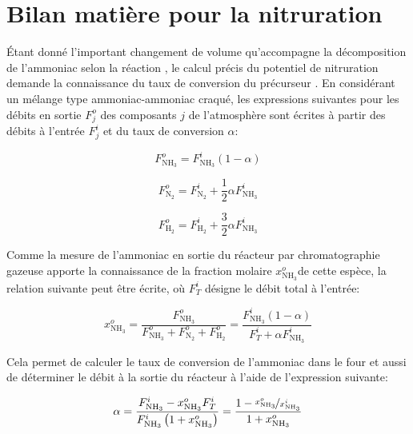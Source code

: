 \chapter{Bilan matière pour la nitruration}
\label{an:ammonia_decomposition}

Étant donné l'important changement de volume qu'accompagne la décomposition de l'ammoniac selon la réaction , le calcul précis du potentiel de nitruration demande la connaissance du taux de conversion du précurseur . En considérant un mélange type ammoniac-ammoniac craqué, les expressions suivantes pour les débits en sortie $F_{j}^{o}$ des composants $j$ de l'atmosphère sont écrites à partir des débits à l'entrée $F_{j}^{i}$ et du taux de conversion $\alpha$:

\[
F_{\mathrm{NH_{3}}}^{o}=F_{\mathrm{NH_{3}}}^{i}\left(1-\alpha\right)
\]

\[
F_{\mathrm{N_{2}}}^{o}=F_{\mathrm{N_{2}}}^{i}+\frac{1}{2}\alpha F_{\mathrm{NH_{3}}}^{i}
\]

\[
F_{\mathrm{H_{2}}}^{o}=F_{\mathrm{H_{2}}}^{i}+\frac{3}{2}\alpha F_{\mathrm{NH_{3}}}^{i}
\]

Comme la mesure de l'ammoniac en sortie du réacteur par chromatographie gazeuse apporte la connaissance de la fraction molaire $x_{\mathrm{NH_{3}}}^{o}$de cette espèce, la relation suivante peut être écrite, où $F_{T}^{i}$ désigne le débit total à l'entrée:

\[
x_{\mathrm{NH_{3}}}^{o}=\frac{F_{\mathrm{NH_{3}}}^{o}}{F_{\mathrm{NH_{3}}}^{o}+F_{\mathrm{N_{2}}}^{o}+F_{\mathrm{H_{2}}}^{o}}=\frac{F_{\mathrm{NH_{3}}}^{i}\left(1-\alpha\right)}{F_{T}^{i}+\alpha F_{\mathrm{NH_{3}}}^{i}}
\]

Cela permet de calculer le taux de conversion de l'ammoniac dans le four et aussi de déterminer le débit à la sortie du réacteur à l'aide de l'expression suivante:

\[
\alpha=\frac{F_{\mathrm{NH_{3}}}^{i}-x_{\mathrm{NH_{3}}}^{o}F_{T}^{i}}{F_{\mathrm{NH_{3}}}^{i}\left(1+x_{\mathrm{NH_{3}}}^{o}\right)}=\frac{1-\nicefrac{x_{\mathrm{NH_{3}}}^{o}}{x_{\mathrm{NH_{3}}}^{i}}}{1+x_{\mathrm{NH_{3}}}^{o}}
\]

\endinput